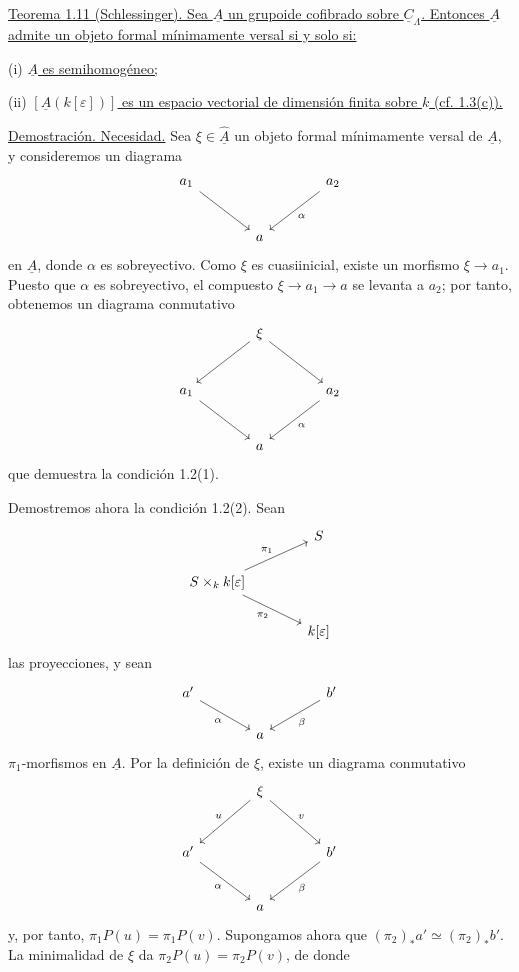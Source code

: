 
\underline{Teorema 1.11 (Schlessinger). Sea $\underline A$ un
grupoide cofibrado sobre $\underline C_\Lambda$. Entonces
$\underline A$ admite un objeto formal mínimamente versal si y solo si:}


(i) \underline{$\underline A$ es semihomogéneo;}

(ii) \underline{$[\underline A(k[\varepsilon])]$ es un espacio
vectorial de dimensión finita sobre $k$ (cf. 1.3(c)).}

\underline{Demostración. Necesidad.} Sea
$\xi\in\widehat{\underline A}$ un objeto formal mínimamente versal de
$\underline A$, y consideremos un diagrama
\[
\begin{tikzcd}[column sep=large,row sep=large]
a_1 \arrow[dr] & & a_2 \arrow[dl,"\alpha"] \\
& a &
\end{tikzcd}
\]
en $\underline A$, donde $\alpha$ es sobreyectivo. Como $\xi$ es
cuasiinicial, existe un morfismo $\xi\longrightarrow a_1$. Puesto que
$\alpha$ es sobreyectivo, el compuesto
$\xi\longrightarrow a_1\longrightarrow a$ se levanta a $a_2$; por
tanto, obtenemos un diagrama conmutativo
\[
\begin{tikzcd}[column sep=large,row sep=large]
& \xi \arrow[dl] \arrow[dr] & \\
a_1 \arrow[dr] & & a_2 \arrow[dl,"\alpha"] \\
& a &
\end{tikzcd}
\]
que demuestra la condición 1.2(1).

Demostremos ahora la condición 1.2(2). Sean
\[
\begin{tikzcd}[column sep=large]
& S \\
S\times_k k[\varepsilon]
 \arrow[ur,"\pi_1"] \arrow[dr,"\pi_2"'] & \\
& k[\varepsilon]
\end{tikzcd}
\]
las proyecciones, y sean
\[
\begin{tikzcd}[column sep=large]
a' \arrow[dr,"\alpha"'] & & b' \arrow[dl,"\beta"] \\
& a &
\end{tikzcd}
\]
$\pi_1$-morfismos en $\underline A$. Por la definición de $\xi$,
existe un diagrama conmutativo
\[
\begin{tikzcd}[column sep=large,row sep=large]
& \xi \arrow[dl,"u"'] \arrow[dr,"v"] & \\
a' \arrow[dr,"\alpha"'] & & b' \arrow[dl,"\beta"] \\
& a &
\end{tikzcd}
\]
y, por tanto, $\pi_1P(u)=\pi_1P(v)$. Supongamos ahora que
$(\pi_2)_*a'\simeq(\pi_2)_*b'$. La minimalidad de $\xi$ da
$\pi_2P(u)=\pi_2P(v)$, de donde

